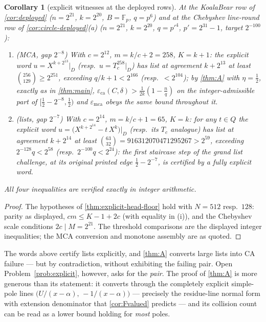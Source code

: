 \documentclass[11pt]{article}
\newtheorem{corollary}[theorem]{Corollary}
\theoremstyle{definition}
\theoremstyle{remark}
\newcommand{\F}{\mathbb{F}}
\newcommand{\B}{B}
\newcommand{\eca}{\varepsilon_{\mathrm{ca}}}
\newcommand{\emca}{\varepsilon_{\mathrm{mca}}}
\begin{document}
\begin{corollary}[explicit witnesses at the deployed rows]\label{cor:explicit-deployed}
At the KoalaBear row of \cref{cor:deployed} \textup($n=2^{21}$, $k=2^{20}$, $\B=\F_p$, $q=p^6$\textup) and at the Chebyshev line-round row of \cref{cor:circle-deployed}\textup{(a)} \textup($n=2^{21}$, $k=2^{20}$, $q=p'^4$, $p'=2^{31}-1$, target $2^{-100}$\textup):
\begin{enumerate}[label=\textup{(\roman*)}]
\item \textup(MCA, gap $2^{-8}$\textup) With $c=2^{12}$, $m=k/c+2=258$, $K=k+1$: the explicit word $u=X^{k+2^{13}}|_D$ \textup(resp.\ $u=T_c^{258}|_D$\textup) has list at agreement $k+2^{13}$ at least $\binom{256}{129}\ge2^{251}$, exceeding $q/k+1<2^{166}$ \textup(resp.\ $<2^{104}$\textup); by \cref{thm:A} with $\eta=\frac12$, exactly as in \cref{thm:main}, $\eca(C,\delta)>\frac1{2k}(1-\frac nq)$ on the integer-admissible part of $[\frac12-2^{-8},\frac12)$ and $\emca$ obeys the same bound throughout it.
\item \textup(lists, gap $2^{-7}$\textup) With $c=2^{14}$, $m=k/c+1=65$, $K=k$: for any $t\in Q$ the explicit word $u=\bigl(X^{k+2^{14}}-t\,X^{k}\bigr)|_D$ \textup(resp.\ its $T_c$ analogue\textup) has list at agreement $k+2^{14}$ at least $\binom{63}{32}=916312070471295267>2^{59}$, exceeding $2^{-128}q<2^{58}$ \textup(resp.\ $2^{-100}q<2^{24}$\textup): the first staircase step of the grand list challenge, at its original printed edge $\frac12-2^{-7}$, is certified by a fully explicit word.
\end{enumerate}
All four inequalities are verified exactly in integer arithmetic.
\end{corollary}

\begin{proof}
The hypotheses of \cref{thm:explicit-head-floor} hold with $N=512$ resp.\ $128$: parity as displayed, $cm\le K-1+2c$ \textup(with equality in \textup{(i)}\textup), and the Chebyshev scale conditions $2c\mid M=2^{21}$. The threshold comparisons are the displayed integer inequalities; the MCA conversion and monotone assembly are as quoted.
\end{proof}

The words above certify lists explicitly, and \cref{thm:A} converts large lists into CA failure --- but by contradiction, without exhibiting the failing pair. Open Problem~\ref{prob:explicit}, however, asks for the \emph{pair}. The proof of \cref{thm:A} is more generous than its statement: it converts through the completely explicit simple-pole lines $\bigl(U/(x-\alpha),\,-1/(x-\alpha)\bigr)$ --- precisely the residue-line normal form with extension denominator that \cref{cor:Fvalued} predicts --- and its collision count can be read as a lower bound holding for \emph{most} poles.
\end{document}

